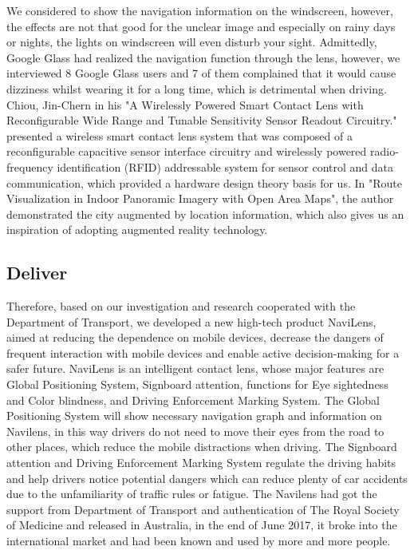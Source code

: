 \documentclass{chi-ext}
\begin{document}
\begin{multicols}{2}
We considered to show the navigation information on the windscreen, however, the effects are not that good for the unclear image and especially on rainy days or nights, the lights on windscreen will even disturb your sight. Admittedly, Google Glass had realized the navigation function through the lens, however, we interviewed 8 Google Glass users and 7 of them complained that it would cause dizziness whilst wearing it for a long time, which is detrimental when driving.
Chiou, Jin-Chern in his "A Wirelessly Powered Smart Contact Lens with Reconfigurable Wide Range and Tunable Sensitivity Sensor Readout Circuitry." \cite {ref1} presented a wireless smart contact lens system that was composed of a reconfigurable capacitive sensor interface circuitry and wirelessly powered radio-frequency identification (RFID) addressable system for sensor control and data communication, which provided a hardware design theory basis for us. In "Route Visualization in Indoor Panoramic Imagery with Open Area Maps"\cite {ref5}, the author demonstrated the city augmented by location information, which also gives us an inspiration of adopting augmented reality technology. \\

\subsection{Deliver}
Therefore, based on our investigation and research cooperated with the Department of Transport, we developed a new high-tech product NaviLens, aimed at reducing the dependence on mobile devices, decrease the dangers of frequent interaction with mobile devices and enable active decision-making for a safer future. NaviLens is an intelligent contact lens, whose major features are Global Positioning System, Signboard attention, functions for Eye sightedness and Color blindness, and Driving Enforcement Marking System. The Global Positioning System will show necessary navigation graph and information on Navilens, in this way drivers do not need to move their eyes from the road to other places, which reduce the mobile distractions when driving. The Signboard attention and Driving Enforcement Marking System regulate the driving habits and help drivers notice potential dangers which can reduce plenty of car accidents due to the unfamiliarity of traffic rules or fatigue. The Navilens had got the support from Department of Transport and authentication of The Royal Society of Medicine and released in Australia, in the end of June 2017, it broke into the international market and had been known and used by more and more people.\\


\end{multicols}
\end{document}
